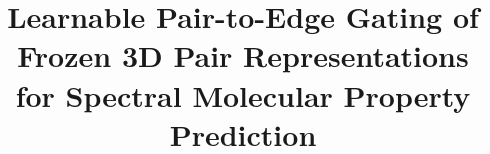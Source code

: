 \documentclass[conference]{IEEEtran}
\begin{document}
\title{Learnable Pair-to-Edge Gating of Frozen 3D Pair Representations\\
for Spectral Molecular Property Prediction}

\author{
}

\maketitle
\end{document}
